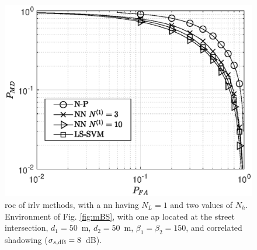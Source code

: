 \documentclass[draftcls,journal,onecolumn]{IEEEtran}
\begin{document}
\begin{figure}[t]
    \centering
    \includegraphics[width=\columnwidth]{res_NP_approx_SVM.eps}
    \caption{\ac{roc} of \ac{irlv} methods, with a \ac{nn} having $N_L=1$ and two values of $N_h$. Environment of Fig. \ref{fig:mBS}, with one \ac{ap} located at the street intersection, $d_1 = 50$~m, $d_2 = 50$~m, $\beta_1 = \beta_2 = 150$, and correlated shadowing ($\sigma_{s, {\rm dB}} = 8$~dB).}
    \label{fig:trueMap}
\end{figure}
\end{document}
